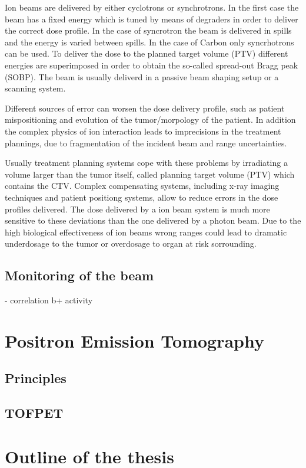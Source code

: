Ion beams are delivered by either cyclotrons or synchrotrons. In the first case the beam has a fixed energy which is tuned by means of degraders in order to deliver the correct dose profile. In the case of syncrotron the beam is delivered in spills and the energy is varied between spills. In the case of Carbon only syncrhotrons can be used.
To deliver the dose to the planned target volume (PTV) different energies are superimposed in order to obtain the so-called spread-out Bragg peak (SOBP). The beam is usually deliverd in a passive beam shaping setup or a scanning system. 

Different sources of error can worsen the dose delivery profile, such as patient mispositioning and evolution of the tumor/morpology of the patient. In addition the complex physics of ion interaction leads to  imprecisions in the treatment plannings, due to fragmentation of the incident beam and range uncertainties.

Usually treatment planning systems cope with these problems by irradiating a volume larger than the tumor itself, called planning target volume (PTV) which contains the CTV. Complex compensating systems, including x-ray imaging techniques and patient positiong systems, allow to reduce errors in the dose profiles delivered.
The dose delivered by a ion beam system is much more sensitive to these deviations than the one delivered by a photon beam. Due to the high biological effectiveness of ion beams wrong ranges could lead to dramatic underdosage to the tumor or overdosage to organ at risk sorrounding.

\subsection{Monitoring of the beam}

- correlation b+ activity

\section{Positron Emission Tomography}
\subsection{Principles}

\subsection{TOFPET}

\section{Outline of the thesis}
